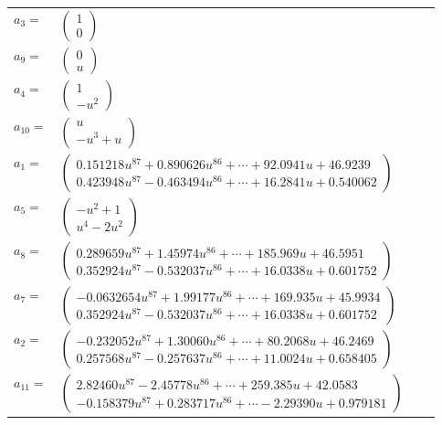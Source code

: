 \documentclass[1p]{elsarticle_modified}
\theoremstyle{definition}
\begin{document}
\begin{tabular}{m{7pt} m{180pt} m{7pt} m{180pt} }
\flushright $a_{3}=$&$\begin{pmatrix}1\\0\end{pmatrix}$ \\
\flushright $a_{9}=$&$\begin{pmatrix}0\\u\end{pmatrix}$ \\
\flushright $a_{4}=$&$\begin{pmatrix}1\\- u^2\end{pmatrix}$ \\
\flushright $a_{10}=$&$\begin{pmatrix}u\\- u^3+u\end{pmatrix}$ \\
\flushright $a_{1}=$&$\begin{pmatrix}0.151218 u^{87}+0.890626 u^{86}+\cdots+92.0941 u+46.9239\\0.423948 u^{87}-0.463494 u^{86}+\cdots+16.2841 u+0.540062\end{pmatrix}$ \\
\flushright $a_{5}=$&$\begin{pmatrix}- u^2+1\\u^4-2 u^2\end{pmatrix}$ \\
\flushright $a_{8}=$&$\begin{pmatrix}0.289659 u^{87}+1.45974 u^{86}+\cdots+185.969 u+46.5951\\0.352924 u^{87}-0.532037 u^{86}+\cdots+16.0338 u+0.601752\end{pmatrix}$ \\
\flushright $a_{7}=$&$\begin{pmatrix}-0.0632654 u^{87}+1.99177 u^{86}+\cdots+169.935 u+45.9934\\0.352924 u^{87}-0.532037 u^{86}+\cdots+16.0338 u+0.601752\end{pmatrix}$ \\
\flushright $a_{2}=$&$\begin{pmatrix}-0.232052 u^{87}+1.30060 u^{86}+\cdots+80.2068 u+46.2469\\0.257568 u^{87}-0.257637 u^{86}+\cdots+11.0024 u+0.658405\end{pmatrix}$ \\
\flushright $a_{11}=$&$\begin{pmatrix}2.82460 u^{87}-2.45778 u^{86}+\cdots+259.385 u+42.0583\\-0.158379 u^{87}+0.283717 u^{86}+\cdots-2.29390 u+0.979181\end{pmatrix}$ \\

\end{tabular}
\end{document}
